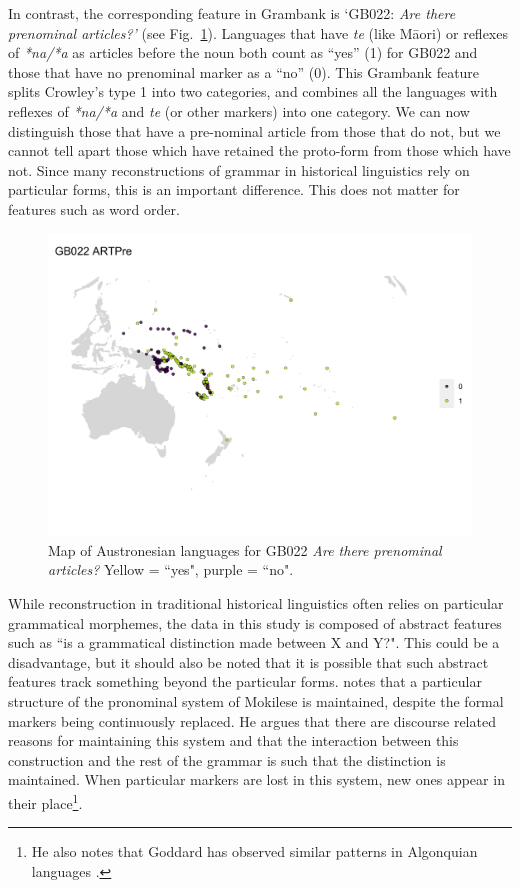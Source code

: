 \documentclass[draft,10pt]{article} %
\begin{document}
In contrast, the corresponding feature in Grambank is `GB022: \emph{Are there prenominal articles?'} (see Fig.~\ref{fig:gb022_map}). Languages that have \emph{te} (like M\={a}ori) or reflexes of \emph{*na/*a} as articles before the noun both count as ``yes'' (1) for GB022 and those that have no prenominal marker as a ``no'' (0). This Grambank feature splits Crowley's type 1 into two categories, and combines all the languages with reflexes of \emph{*na/*a} and \emph{te} (or other markers) into one category. We can now distinguish those that have a pre-nominal article from those that do not, but we cannot tell apart those which have retained the proto-form from those which have not. Since many reconstructions of grammar in historical linguistics rely on particular forms, this is an important difference. This does not matter for features such as word order.

\begin{figure}
\centering
\includegraphics[width=20cm]{illustrations/plots_from_R/coverage_plots/maps/map_GB022.png}
\caption{{Map of Austronesian languages for GB022 \emph{Are there prenominal articles?} Yellow = ``yes", purple = ``no".}}
\label{fig:gb022_map}
\end{figure}

While reconstruction in traditional historical linguistics often relies on particular grammatical morphemes, the data in this study is composed of abstract features such as ``is a grammatical distinction made between X and Y?". This could be a disadvantage, but it should also be noted that it is possible that such abstract features track something beyond the particular forms. \citet[503]{ross2004morphosyntactic} notes that a particular structure of the pronominal system of Mokilese is maintained, despite the formal markers being continuously replaced. He argues that there are discourse related reasons for maintaining this system and that the interaction between this construction and the rest of the grammar is such that the distinction is maintained. When particular markers are lost in this system, new ones appear in their place\footnote{He also notes that Goddard has observed similar patterns in Algonquian languages \citep{goddard1993algonquian}.}.
\end{document}
